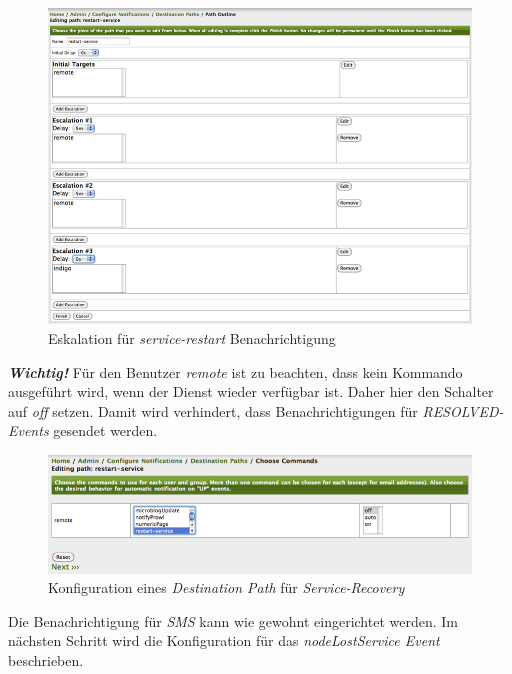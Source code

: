 \begin{figure}[H]
	\centering
	\includegraphics[width=1.0\textwidth]{images/use-cases/service-recovery/escalation}
	\caption{Eskalation für \emph{service-restart} Benachrichtigung}
	\label{pic:escalation-service-restart}
\end{figure}

\textbf{\textit{Wichtig!}} Für den Benutzer \emph{remote} ist zu beachten, dass kein Kommando ausgeführt wird, wenn der Dienst wieder verfügbar ist. Daher hier den Schalter auf \emph{off} setzen. Damit wird verhindert, dass Benachrichtigungen für \emph{RESOLVED-Events} gesendet werden.

\begin{figure}[H]
	\centering
	\includegraphics[width=1.0\textwidth]{images/use-cases/service-recovery/destination-path}
	\caption{Konfiguration eines \emph{Destination Path} für \emph{Service-Recovery}}
	\label{pic:destination-path-service-restart}
\end{figure}

Die Benachrichtigung für \emph{SMS} kann wie gewohnt eingerichtet werden. Im nächsten Schritt wird die Konfiguration für das \emph{nodeLostService Event} beschrieben.

